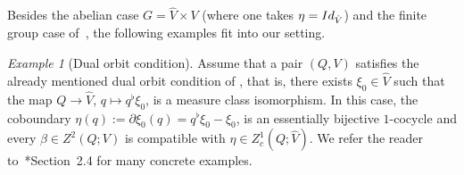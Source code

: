 \documentclass[a4paper,11pt,reqno]{amsart}
\numberwithin{equation}{section}
\theoremstyle{remark}
\newtheorem{example}[theorem]{Example}
\theoremstyle{definition}
\begin{document}
Besides  the abelian case $G=\hat V\times V$ (where one takes $\eta={\rm Id}_{\hat V}$) and the finite group case of~\cites{EG,MR2534251}, the following
examples fit into our setting.

\begin{example}[Dual orbit condition]
Assume that a pair $(Q,V)$ satisfies the already mentioned dual orbit condition of \cite{BGNT3}, that is, there exists $\xi_0\in\hat V$ such that the map
$Q\to\hat V$, $q\mapsto q^\flat \xi_0$, is a measure class isomorphism. In this case, the coboundary $\eta(q):=\partial\xi_0(q)=q^\flat\xi_0-\xi_0$, is an essentially bijective $1$-cocycle
and every $\beta\in Z^2(Q;V)$ is compatible with $\eta\in Z^1_c(Q;\hat V)$. We refer the reader to~\cite{BGNT3}*{Section~2.4} for many concrete examples.
\end{example}
\end{document}
